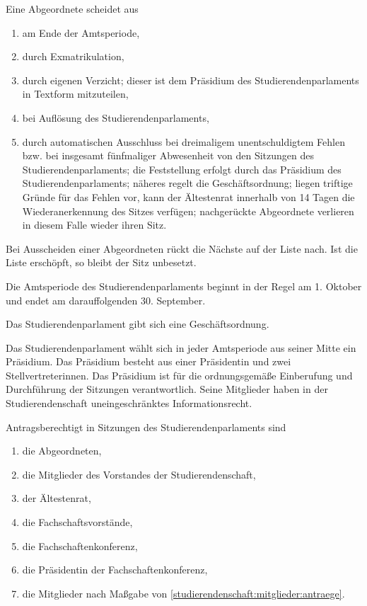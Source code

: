 \begin{contract}
Eine Abgeordnete scheidet aus \label{stupa:zusammensetzung:ausscheiden} 
  \begin{enumerate}
  \item am Ende der Amtsperiode,
  \item durch Exmatrikulation,
  \item durch eigenen Verzicht; dieser ist dem Präsidium des Studierendenparlaments in Textform mitzuteilen,
  \item bei Auflösung des Studierendenparlaments,
  \item durch automatischen Ausschluss bei dreimaligem unentschuldigtem Fehlen bzw. bei insgesamt fünfmaliger Abwesenheit von den Sitzungen des Studierendenparlaments; die Feststellung erfolgt durch das Präsidium des Studierendenparlaments; näheres regelt die Geschäftsordnung; liegen triftige Gründe für das Fehlen vor, kann der Ältestenrat innerhalb von 14 Tagen die Wiederanerkennung des Sitzes verfügen; nachgerückte Abgeordnete verlieren in diesem Falle wieder ihren Sitz. \label{stupa:zusammensetzung:ausscheiden:wiederanerkennung}
\end{enumerate}
Bei Ausscheiden einer Abgeordneten rückt die Nächste auf der Liste nach. Ist die Liste erschöpft, so bleibt der Sitz unbesetzt.

Die Amtsperiode des Studierendenparlaments beginnt in der Regel am 1. Oktober und endet am darauffolgenden 30. September.



Das Studierendenparlament gibt sich eine Geschäftsordnung.

Das Studierendenparlament wählt sich in jeder Amtsperiode aus seiner Mitte ein Präsidium. Das Präsidium besteht aus einer Präsidentin und zwei Stellvertreterinnen. Das Präsidium ist für die ordnungsgemäße Einberufung und Durchführung der Sitzungen verantwortlich. Seine Mitglieder haben in der Studierendenschaft uneingeschränktes Informationsrecht.

Antragsberechtigt in Sitzungen des Studierendenparlaments sind
  \begin{enumerate}
  \item die Abgeordneten,
  \item die Mitglieder des Vorstandes der Studierendenschaft,
  \item der Ältestenrat,
  \item die Fachschaftsvorstände,
  \item die Fachschaftenkonferenz,
  \item die Präsidentin der Fachschaftenkonferenz,
  \item die Mitglieder nach Maßgabe von \ref{studierendenschaft:mitglieder:antraege}.
  \end{enumerate}


\end{contract}
